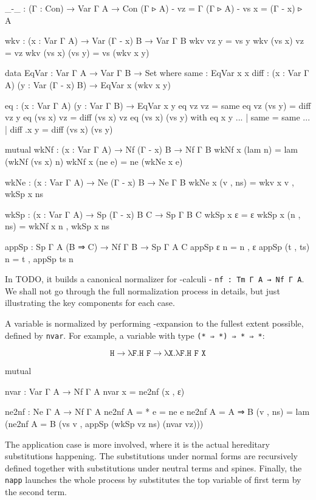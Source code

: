 \begin{code}[hide]
_-_ : (Γ : Con) → Var Γ A → Con
(Γ ▹ A) - vz = Γ
(Γ ▹ A) - vs x = (Γ - x) ▹ A

wkv : (x : Var Γ A) → Var (Γ - x) B → Var Γ B
wkv vz y = vs y
wkv (vs x) vz = vz
wkv (vs x) (vs y) = vs (wkv x y)

data EqVar : Var Γ A → Var Γ B → Set where
  same : EqVar x x
  diff : (x : Var Γ A) (y : Var (Γ - x) B) → EqVar x (wkv x y)

eq : (x : Var Γ A) (y : Var Γ B) → EqVar x y
eq vz vz = same
eq vz (vs y) = diff vz y
eq (vs x) vz = diff (vs x) vz
eq (vs x) (vs y) with eq x y
... | same = same
... | diff .x y = diff (vs x) (vs y)

mutual
  wkNf : (x : Var Γ A) → Nf (Γ - x) B → Nf Γ B
  wkNf x (lam n) = lam (wkNf (vs x) n)
  wkNf x (ne e) = ne (wkNe x e)

  wkNe : (x : Var Γ A) → Ne (Γ - x) B → Ne Γ B
  wkNe x (v , ns) = wkv x v , wkSp x ns

  wkSp : (x : Var Γ A) → Sp (Γ - x) B C → Sp Γ B C
  wkSp x ε = ε
  wkSp x (n , ns) = wkNf x n , wkSp x ns

appSp : Sp Γ A (B ⇒ C) → Nf Γ B → Sp Γ A C
appSp ε n = n , ε
appSp (t , ts) n = t , appSp ts n
\end{code}

In TODO, it builds a canonical normalizer for \lambda-calculi - \texttt{nf : Tm Γ A → Nf Γ A}. We shall not go through the full normalization process in details, but just illustrating the key components for each case.

A variable is normalized by performing \eta-expansion to the fullest extent possible, defined by \texttt{nvar}. For example, a variable with type \texttt{(* ⇒ *) ⇒ * ⇒ *}:

\[ \texttt{H} \rightarrow \texttt{λF.H F} \rightarrow \texttt{λX.λF.H F X} \]

\begin{code}[hide]
mutual
\end{code}

\begin{code}
  nvar : Var Γ A → Nf Γ A
  nvar x = ne2nf (x , ε)

  ne2nf : Ne Γ A → Nf Γ A
  ne2nf {A = *} e = ne e
  ne2nf {A = A ⇒ B} (v , ns) =
    lam (ne2nf {A = B} (vs v , appSp (wkSp vz ns) (nvar vz)))
\end{code}

The application case is more involved, where it is the actual hereditary substitutions happening. The substitutions under normal forms are recursively defined together with substitutions under neutral terms and spines. Finally, the \texttt{napp} launches the whole process by substitutes the top variable of first term by the second term.

